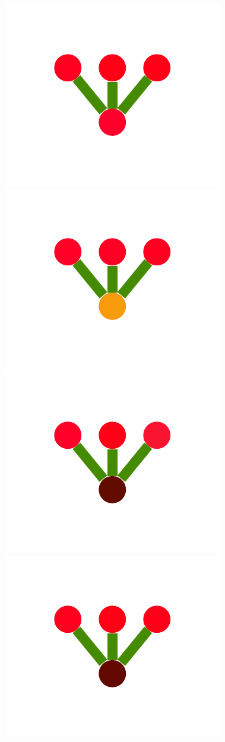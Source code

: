 \documentclass[a4paper,10pt]{article}
\begin{document}
\begin{figure}
{    \includegraphics[scale=.26]{./figures/4-2-1-noisyprog-postA-1.pdf}
    \includegraphics[scale=.26]{./figures/4-2-1-noisyprog-postA-2.pdf}
    \includegraphics[scale=.26]{./figures/4-2-1-noisyprog-postA-3.pdf}
    \includegraphics[scale=.26]{./figures/4-2-1-noisyprog-postA-4.pdf}
}
\end{figure}
\end{document}
